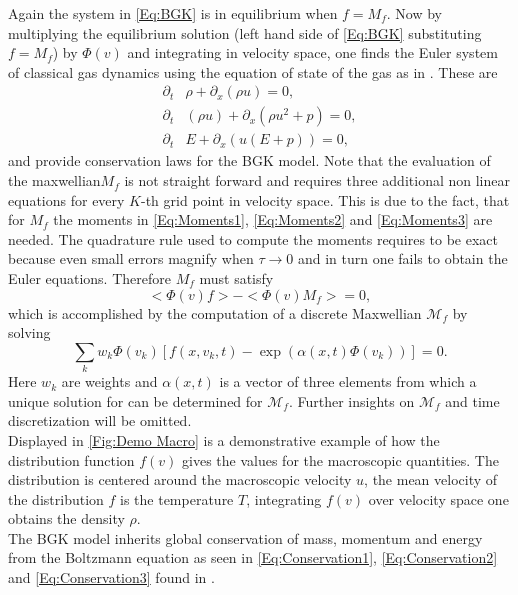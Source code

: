 Again the system in \cref{Eq:BGK} is in equilibrium when \(f = M_f\). Now by multiplying the equilibrium solution (left hand side of \cref{Eq:BGK} substituting \(f=M_f\)) by \(\Phi(v)\) and integrating in velocity space, one finds the Euler system of classical gas dynamics using the equation of state of the gas as in \cite{puppo2019kinetic}. These are
\begin{align}
	\partial_t&\rho + \partial_x(\rho u) = 0 \mathrm{,}\label{Eq:Conservation1} \\
	\partial_t&(\rho u) + \partial_x(\rho u^2 + p) = 0\mathrm{,}\label{Eq:Conservation2}\\
	\partial_t&E + \partial_x(u(E+p)) = 0\label{Eq:Conservation3}\mathrm{,}
\end{align}
and provide conservation laws for the BGK model. Note that the evaluation of the maxwellian\(M_f\) is not straight forward and requires three additional non linear equations for every \(K\)-th grid point in velocity space. This is due to the fact, that for \(M_f\) the moments in \cref{Eq:Moments1}, \cref{Eq:Moments2} and \cref{Eq:Moments3} are needed. The quadrature rule used to compute the moments requires to be exact because even small errors magnify when \(\tau \rightarrow 0\) and in turn one fails to obtain the Euler equations. Therefore \(M_f\) must satisfy  
\begin{equation}
	<\Phi(v)f> - <\Phi(v)M_f> = 0\mathrm{,}
\end{equation}
which is accomplished by the computation of a discrete Maxwellian \(\mathcal{M}_f\) by solving
\begin{equation}
	\sum_k w_k \Phi(v_k) [f(x,v_k,t) - \exp(\alpha(x,t)\Phi(v_k))] = 0\mathrm{.}
\end{equation}
Here \(w_k\) are weights and \(\alpha(x,t)\) is a vector of three elements from which a unique solution for can be determined for \(\mathcal{M}_f\). Further insights on \(\mathcal{M}_f\) and time discretization will be omitted.\\

Displayed in \cref{Fig:Demo Macro} is a demonstrative example of how the distribution function \(f(v)\) gives the values for the macroscopic quantities. The distribution is centered around the macroscopic velocity \(u\), the mean velocity of the distribution \(f\) is the temperature \(T\), integrating \(f(v)\) over velocity space one obtains the density \(\rho\).\\ 

The BGK model inherits global conservation of mass, momentum and energy from the Boltzmann equation as seen in \cref{Eq:Conservation1}, \cref{Eq:Conservation2} and \cref{Eq:Conservation3} found in \cite{puppo2019kinetic}.
